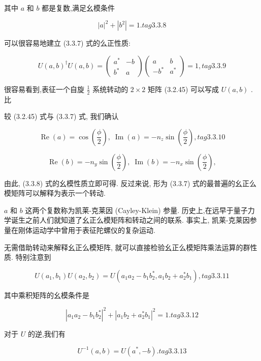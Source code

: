 其中 $a$ 和 $b$ 都是复数,满足幺模条件

$$
{\left| a\right| }^{2} + \left| {b}^{2}\right| = 1. tag{3.3.8}
$$

可以很容易地建立 (3.3.7) 式的么正性质:

$$
U{\left( a, b\right) }^{ \dagger }U\left( {a, b}\right) = \left( \begin{matrix} {a}^{ * } & - b \\ {b}^{ * } & a \end{matrix}\right) \left( \begin{matrix} a & b \\ - {b}^{ * } & {a}^{ * } \end{matrix}\right) = 1, tag{3.3.9}
$$

很容易看到,表征一个自旋 $\frac{1}{2}$ 系统转动的 $2 \times 2$ 矩阵 (3.2.45) 可以写成 $U\left( {a, b}\right)$ . 比

较 (3.2.45) 式与 (3.3.7) 式, 我们确认

$$
\operatorname{Re}\left( a\right) = \cos \left( \frac{\phi }{2}\right) ,\;\operatorname{Im}\left( a\right) = - {n}_{z}\sin \left( \frac{\phi }{2}\right) , tag{3. 3.10}
$$

$$
\operatorname{Re}\left( b\right) = - {n}_{y}\sin \left( \frac{\phi }{2}\right) ,\;\operatorname{Im}\left( b\right) = - {n}_{x}\sin \left( \frac{\phi }{2}\right) ,
$$

由此, (3.3.8) 式的幺模性质立即可得. 反过来说, 形为 (3.3.7) 式的最普遍的幺正么模矩阵可以解释为表示一个转动.

$a$ 和 $b$ 这两个复数称为凯莱-克莱因 (Cayley-Klein) 参量. 历史上,在远早于量子力学诞生之前人们就知道了幺正么模矩阵和转动之间的联系. 事实上, 凯莱-克莱因参量在刚体运动学中曾用于表征陀螺仪的复杂运动.

无需借助转动来解释幺正么模矩阵, 就可以直接检验幺正么模矩阵乘法运算的群性质. 特别注意到

$$
U\left( {{a}_{1},{b}_{1}}\right) U\left( {{a}_{2},{b}_{2}}\right) = U\left( {{a}_{1}{a}_{2} - {b}_{1}{b}_{2}^{ * },{a}_{1}{b}_{2} + {a}_{2}^{ * }{b}_{1}}\right) , tag{3. 3.11}
$$

其中乘积矩阵的幺模条件是

$$
{\left| {a}_{1}{a}_{2} - {b}_{1}{b}_{2}^{ * }\right| }^{2} + {\left| {a}_{1}{b}_{2} + {a}_{2}^{ * }{b}_{1}\right| }^{2} = 1. tag{3. 3.12}
$$

对于 $U$ 的逆,我们有

$$
{U}^{-1}\left( {a, b}\right) = U\left( {{a}^{ * }, - b}\right) . tag{3. 3.13}
$$

